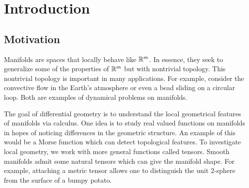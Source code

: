 
\section{Introduction}

\subsection{Motivation}
Manifolds are spaces that locally behave like $\mathbb{R}^m$.  In essence, they seek to generalize some of the properties of $\mathbb{R}^m$ but with nontrivial topology.  This nontrivial topology is important in many applications.  For example, consider the convective flow in the Earth's atmosphere or even a bead sliding on a circular loop. Both are examples of dynamical problems on manifolds.

The goal of differential geometry is to understand the local geometrical features of manifolds via calculus. One idea is to study real valued functions on manifolds in hopes of noticing differences in the geometric structure.  An example of this would be a Morse function which can detect topological features.  To investigate local geometry, we work with more general functions called tensors. Smooth manifolds admit some natural tensors which can give the manifold shape. For example, attaching a metric tensor allows one to distinguish the unit 2-sphere from the surface of a bumpy potato.

